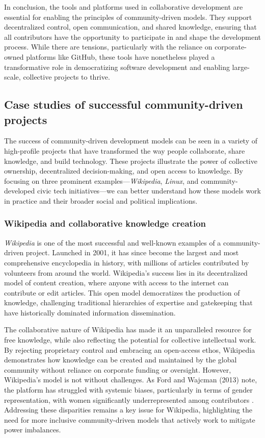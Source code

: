 \begin{refsection}
In conclusion, the tools and platforms used in collaborative development are essential for enabling the principles of community-driven models. They support decentralized control, open communication, and shared knowledge, ensuring that all contributors have the opportunity to participate in and shape the development process. While there are tensions, particularly with the reliance on corporate-owned platforms like GitHub, these tools have nonetheless played a transformative role in democratizing software development and enabling large-scale, collective projects to thrive.

\subsection{Case studies of successful community-driven projects}

The success of community-driven development models can be seen in a variety of high-profile projects that have transformed the way people collaborate, share knowledge, and build technology. These projects illustrate the power of collective ownership, decentralized decision-making, and open access to knowledge. By focusing on three prominent examples—\textit{Wikipedia}, \textit{Linux}, and community-developed civic tech initiatives—we can better understand how these models work in practice and their broader social and political implications.

\subsubsection{Wikipedia and collaborative knowledge creation}

\textit{Wikipedia} is one of the most successful and well-known examples of a community-driven project. Launched in 2001, it has since become the largest and most comprehensive encyclopedia in history, with millions of articles contributed by volunteers from around the world. Wikipedia's success lies in its decentralized model of content creation, where anyone with access to the internet can contribute or edit articles. This open model democratizes the production of knowledge, challenging traditional hierarchies of expertise and gatekeeping that have historically dominated information dissemination.

The collaborative nature of Wikipedia has made it an unparalleled resource for free knowledge, while also reflecting the potential for collective intellectual work. By rejecting proprietary control and embracing an open-access ethos, Wikipedia demonstrates how knowledge can be created and maintained by the global community without reliance on corporate funding or oversight. However, Wikipedia's model is not without challenges. As Ford and Wajcman (2013) note, the platform has struggled with systemic biases, particularly in terms of gender representation, with women significantly underrepresented among contributors \cite[pp.~45-47]{ford2013}. Addressing these disparities remains a key issue for Wikipedia, highlighting the need for more inclusive community-driven models that actively work to mitigate power imbalances.


\end{refsection}
